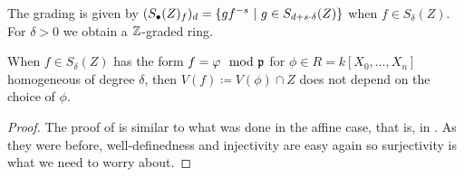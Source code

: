 \documentclass[a4paper,parskip=half,numbers=enddot, DIV=12]{scrreprt}
\begin{document}
\begin{rem*}
    \begin{alphanumerate}
        \item 
            The grading is given by $(S_\bullet(Z)_f)_d =\left\{gf^{-s}\ \middle|\  g\in S_{d+s\cdot \delta}(Z)\right\}$ when $f\in S_\delta(Z)$. For $\delta>0$ we obtain a $\mathbb{Z}$-graded ring.
        \item 
            When $f\in S_\delta(Z)$ has the form $f=\varphi \mod {\mathfrak{p}}$ for $\phi \in R = k[X_0,\ldots, X_n]$ homogeneous of degree $\delta$, then $V(f)\coloneqq V(\phi)\cap Z$ does not depend on the choice of $\phi$.
    \end{alphanumerate}
\end{rem*}
\begin{proof}
    The proof of  is similar to what was done in the affine case, that is, in \cite[Proposition~2.2.2]{alg1}. As they were before, well-definedness and injectivity are easy again so surjectivity is what we need to worry about. 
    

\end{proof}
\end{document}
